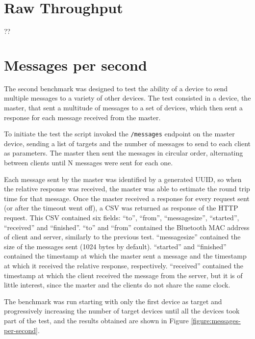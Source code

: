 \section{Raw Throughput}

??

\section{Messages per second}
The second benchmark was designed to test the ability of a device to send multiple messages to a variety of other devices.
The test consisted in a device, the master, that sent a multitude of messages to a set of devices, which then sent a response for each message received from the master.

To initiate the test the script invoked the \texttt{/messages} endpoint on the master device, sending a list of targets and the number of messages to send to each client as parameters.
The master then sent the messages in circular order, alternating between clients until N messages were sent for each one.

Each message sent by the master was identified by a generated UUID, so when the relative response was received, the master was able to estimate the round trip time for that message.
Once the master received a response for every request sent (or after the timeout went off), a CSV was returned as response of the HTTP request.
This CSV contained six fields: ``to'', ``from'', ``message\textunderscore size'', ``started'', ``received'' and ``finished''.
``to'' and ``from'' contained the Bluetooth MAC address of client and server, similarly to the previous test.
``message\textunderscore size'' contained the size of the messages sent (1024 bytes by default).
``started'' and ``finished'' contained the timestamp at which the master sent a message and the timestamp at which it received the relative response, respectively.
``received'' contained the timestamp at which the client received the message from the server, but it is of little interest, since the master and the clients do not share the same clock.

The benchmark was run starting with only the first device as target and progressively increasing the number of target devices until all the devices took part of the test, and the results obtained are shown in Figure \ref{figure:messages-per-second}.

